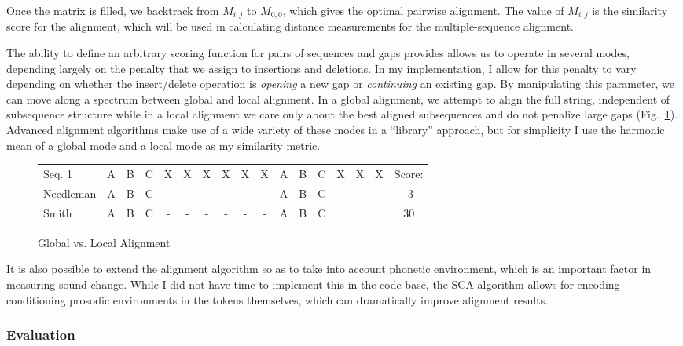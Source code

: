 \documentclass[doc,natbib,12pt]{apa6}
\begin{document}
Once the matrix is filled, we backtrack from $M_{i,j}$ to $M_{0,0}$, which gives the optimal pairwise alignment. The value of $M_{i,j}$ is the similarity score for the alignment, which will be used in calculating distance measurements for the multiple-sequence alignment. 

The ability to define an arbitrary scoring function for pairs of sequences and gaps provides allows us to operate in several modes, depending largely on the penalty that we assign to insertions and deletions. In my implementation, I allow for this penalty to vary depending on whether the insert/delete operation is \emph{opening} a new gap or \emph{continuing} an existing gap. By manipulating this parameter, we can move along a spectrum between global and local alignment. In a global alignment, we attempt to align the full string, independent of subsequence structure while in a local alignment we care only about the best aligned subsequences and do not penalize large gaps (Fig.~\ref{figure:1}). Advanced alignment algorithms make use of a wide variety of these modes in a ``library'' approach, but for simplicity I use the harmonic mean of a global mode and a local mode as my similarity metric.


\begin{figure}[h]
	
	\begin{tabular}{|l||ccccccccccccccc||c|}
		\hline
		Seq. 1 & A&B&C&X&X&X&X&X&X&A&B&C&X&X&X&Score:\\
		Needleman & A&B&C&-&-&-&-&-&-&A&B&C&-&-&-&-3\\
		Smith & A&B&C&-&-&-&-&-&-&A&B&C&&&&30\\\hline
	\end{tabular}
	\caption{Global vs. Local Alignment}
	\label{figure:1}
\end{figure}



It is also possible to extend the alignment algorithm so as to take into account phonetic environment, which is an important factor in measuring sound change. While I did not have time to implement this in the code base, the SCA algorithm allows for encoding conditioning prosodic environments in the tokens themselves, which can dramatically improve alignment results.

\subsubsection{Evaluation}
\end{document}
